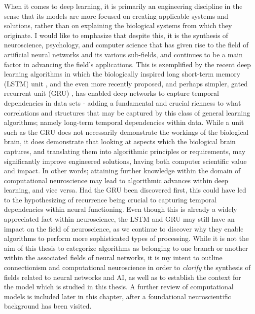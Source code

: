 When it comes to deep learning, it is primarily an engineering discipline in the sense that its models are more focused on creating applicable systems and solutions, rather than on explaining the biological systems from which they originate. I would like to emphasize that despite this, it is the synthesis of neuroscience, psychology, and computer science that has given rise to the field of artificial neural networks \citep{McCulloch1943} and its various sub-fields, and continues to be a main factor in advancing the field's applications. This is exemplified by the recent deep learning algorithms in which the biologically inspired long short-term memory (LSTM) unit \citep{Hochreiter1997}, and the even more recently proposed, and perhaps simpler, gated recurrent unit (GRU) \citep{Mnih2015}, has enabled deep networks to capture temporal dependencies in data sets - adding a fundamental and crucial richness to what correlations and structures that may be captured by this class of general learning algorithms; namely long-term temporal dependencies within data. 
While a unit such as the GRU does not necessarily demonstrate the workings of the biological brain, it does demonstrate that looking at aspects which the biological brain captures, and translating them into algorithmic principles or requirements, may significantly improve engineered solutions, having both computer scientific value and impact. In other words; attaining further knowledge within the domain of computational neuroscience may lead to algorithmic advances within deep learning, and vice versa. Had the GRU been discovered first, this could have led to the hypothesizing of recurrence being crucial to capturing temporal dependencies within neural functioning. Even though this is already a widely appreciated fact within neuroscience, the LSTM and GRU may still have an impact on the field of neuroscience, as we continue to discover why they enable algorithms to perform more sophisticated types of processing. While it is not the aim of this thesis to categorize algorithms as belonging to one branch or another within the associated fields of neural networks, it is my intent to outline connectionism and computational neuroscience in order to \textit{clarify} the synthesis of fields related to neural networks and AI, as well as to establish the context for the model which is studied in this thesis. A further review of computational models is included later in this chapter, after a foundational neuroscientific background has been visited.


